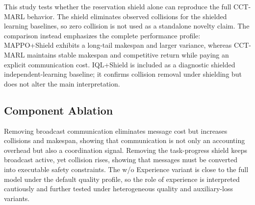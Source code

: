 \documentclass[fleqn,10pt]{wlpeerj}
\begin{document}
This study tests whether the reservation shield alone can reproduce the full CCT-MARL behavior. The shield eliminates observed collisions for the shielded learning baselines, so zero collision is not used as a standalone novelty claim. The comparison instead emphasizes the complete performance profile: MAPPO+Shield exhibits a long-tail makespan and larger variance, whereas CCT-MARL maintains stable makespan and competitive return while paying an explicit communication cost. IQL+Shield is included as a diagnostic shielded independent-learning baseline; it confirms collision removal under shielding but does not alter the main interpretation.

\subsection{Component Ablation}

\begin{table}[htbp]
\centering
\caption{Component ablation of CCT-MARL.}
\label{tab:ablation}
\end{table}

Removing broadcast communication eliminates message cost but increases collisions and makespan, showing that communication is not only an accounting overhead but also a coordination signal. Removing the task-progress shield keeps broadcast active, yet collision rises, showing that messages must be converted into executable safety constraints. The w/o Experience variant is close to the full model under the default quality profile, so the role of experience is interpreted cautiously and further tested under heterogeneous quality and auxiliary-loss variants.
\end{document}
